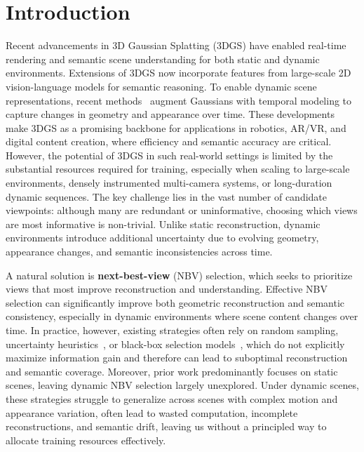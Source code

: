 \section{Introduction}
Recent advancements in 3D Gaussian Splatting (3DGS) have enabled real-time rendering and semantic scene understanding for both static and dynamic environments. Extensions of 3DGS now incorporate features from large-scale 2D vision-language models for semantic reasoning. To enable dynamic scene representations, recent methods~\cite{DNERF,dynerf,dynamic3dgs,4dgs,gs-flow,fully} augment Gaussians with temporal modeling to capture changes in geometry and appearance over time. These developments make 3DGS as a promising backbone for applications in robotics, AR/VR, and digital content creation, where efficiency and semantic accuracy are critical. However, the potential of 3DGS in such real-world settings is limited by the substantial resources required for training, especially when scaling to large-scale environments, densely instrumented multi-camera systems, or long-duration dynamic sequences. The key challenge lies in the vast number of candidate viewpoints: although many are redundant or uninformative, choosing which views are most informative is non-trivial. Unlike static reconstruction, dynamic environments introduce additional uncertainty due to evolving geometry, appearance changes, and semantic inconsistencies across time. 

A natural solution is \textbf{next-best-view} (NBV) selection, which seeks to prioritize views that most improve reconstruction and understanding. Effective NBV selection can significantly improve both geometric reconstruction and semantic consistency, especially in dynamic environments where scene content changes over time. In practice, however, existing strategies often rely on random sampling, uncertainty heuristics~\cite{CSS, activeneural}, or black-box selection models~\cite{dnrselect, activeinitsplat}, which do not explicitly maximize information gain and therefore can lead to suboptimal reconstruction and semantic coverage. Moreover, prior work predominantly focuses on static scenes, leaving dynamic NBV selection largely unexplored. Under dynamic scenes, these strategies struggle to generalize across scenes with complex motion and appearance variation, often lead to wasted computation, incomplete reconstructions, and semantic drift, leaving us without a principled way to allocate training resources effectively. 


